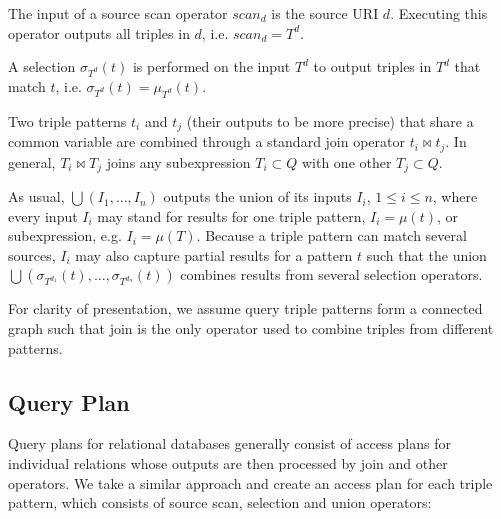\begin{definition} The input of a source scan operator $scan_d$ is the source URI $d$.
Executing this operator outputs all triples in $d$, i.e. $scan_d = T^d$.
\end{definition}

\begin{definition}[Selection]  A selection $\sigma_{T^d}(t)$ is performed on the input $T^d$ to output
triples in $T^d$ that match $t$, i.e. $\sigma_{T^d}(t) = \mu_{T^d}(t)$. 
\end{definition}

Two triple patterns $t_i$ and $t_j$ (their outputs to be more precise) that share a common variable are combined through a standard join operator $t_i\Join t_j$. In general, $T_i\Join T_j$ joins any subexpression $T_i \subset Q$ with one other $T_j \subset Q$. 

\begin{definition}[Union] As usual, $\bigcup(I_1,\ldots,I_n)$
outputs the union of its inputs $I_i$, $1\leq i \leq n$, where every input $I_i$ may stand for results for one triple pattern, $I_i = \mu(t)$, or subexpression, e.g. $I_i = \mu(T)$. Because a triple pattern can match several sources, $I_i$ may also capture partial results for a pattern $t$ such that the union
$\bigcup(\sigma_{T^{d_1}}(t),\ldots,\sigma_{T^{d_n}}(t))$ combines results from several selection operators.   
\end{definition}

For clarity of presentation, we assume query triple patterns form a connected graph such that join is the only operator used to combine triples from different patterns. 


\subsection{Query Plan}
\label{sec:basicshape}
Query plans for relational databases generally consist of access plans
for individual relations whose outputs are then processed by join and
other operators. We take a similar approach and create an
access plan for each triple pattern, which consists of source scan, selection and union
operators:

